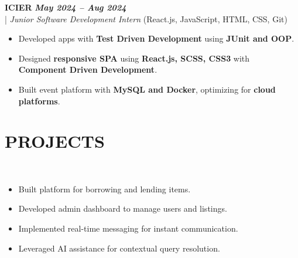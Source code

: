 \documentclass[10pt,a4paper]{article}
\begin{document}
\vspace{5pt}
\noindent
   \textbf{ICIER} \hfill \textit{\textbf{May 2024 -- Aug 2024}} \\
  \;|\;
  \textit{Junior Software Development Intern} (React.js, JavaScript, HTML, CSS, Git)
  \hfill

\begin{itemize}



\item Developed apps with \textbf{Test Driven Development} using \textbf{JUnit and OOP}.



\item Designed \textbf{responsive SPA} using \textbf{React.js, SCSS, CSS3} with \textbf{Component Driven Development}.



\item Built event platform with \textbf{MySQL and Docker}, optimizing for \textbf{cloud platforms}.



\end{itemize}
\section*{PROJECTS}
\small

\noindent
{}\\[-12pt]
\begin{itemize}

\item Built platform for borrowing and lending items.

\item Developed admin dashboard to manage users and listings.

\item Implemented real-time messaging for instant communication.

\item Leveraged AI assistance for contextual query resolution.

\end{itemize}
\end{document}
